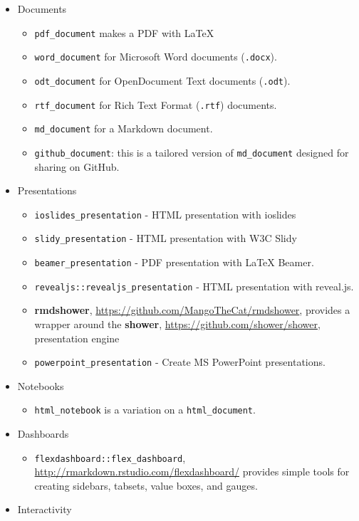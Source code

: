 \documentclass[]{book}
\providecommand{\tightlist}{%
  \setlength{\itemsep}{0pt}\setlength{\parskip}{0pt}}
\theoremstyle{definition}
\theoremstyle{definition}
\theoremstyle{definition}
\theoremstyle{remark}
\begin{document}
\begin{itemize}
\tightlist
\item
  Documents

  \begin{itemize}
  \tightlist
  \item
    \texttt{pdf\_document} makes a PDF with LaTeX
  \item
    \texttt{word\_document} for Microsoft Word documents
    (\texttt{.docx}).
  \item
    \texttt{odt\_document} for OpenDocument Text documents
    (\texttt{.odt}).
  \item
    \texttt{rtf\_document} for Rich Text Format (\texttt{.rtf})
    documents.
  \item
    \texttt{md\_document} for a Markdown document.
  \item
    \texttt{github\_document}: this is a tailored version of
    \texttt{md\_document} designed for sharing on GitHub.
  \end{itemize}
\item
  Presentations

  \begin{itemize}
  \tightlist
  \item
    \texttt{ioslides\_presentation} - HTML presentation with ioslides
  \item
    \texttt{slidy\_presentation} - HTML presentation with W3C Slidy
  \item
    \texttt{beamer\_presentation} - PDF presentation with LaTeX Beamer.
  \item
    \texttt{revealjs::revealjs\_presentation} - HTML presentation with
    reveal.js.
  \item
    \textbf{rmdshower}, \url{https://github.com/MangoTheCat/rmdshower},
    provides a wrapper around the \textbf{shower},
    \url{https://github.com/shower/shower}, presentation engine
  \item
    \texttt{powerpoint\_presentation} - Create MS PowerPoint
    presentations.
  \end{itemize}
\item
  Notebooks

  \begin{itemize}
  \tightlist
  \item
    \texttt{html\_notebook} is a variation on a \texttt{html\_document}.
  \end{itemize}
\item
  Dashboards

  \begin{itemize}
  \tightlist
  \item
    \texttt{flexdashboard::flex\_dashboard},
    \url{http://rmarkdown.rstudio.com/flexdashboard/} provides simple
    tools for creating sidebars, tabsets, value boxes, and gauges.
  \end{itemize}
\item
  Interactivity


\end{itemize}
\end{document}
